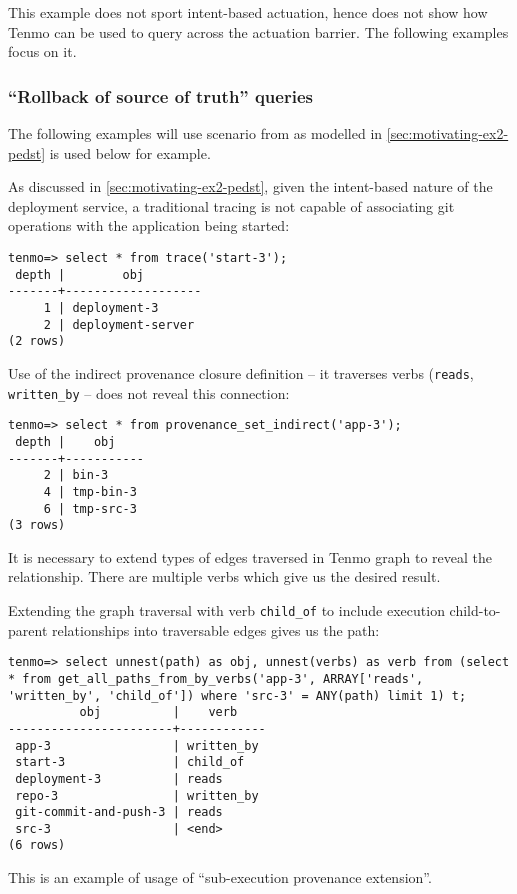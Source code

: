 This example does not sport intent-based actuation, hence does not show how Tenmo can be used to query across the actuation barrier. The following examples focus on it.

\subsubsection{``Rollback of source of truth'' queries}

The following examples will use scenario from  as modelled in \cref{sec:motivating-ex2-pedst} is used below for example.

As discussed in \cref{sec:motivating-ex2-pedst}, given the intent-based nature of the deployment service, a traditional tracing is not capable of associating git operations with the application being started:
\begin{verbatim}
tenmo=> select * from trace('start-3');
 depth |        obj        
-------+-------------------
     1 | deployment-3
     2 | deployment-server
(2 rows)
\end{verbatim}

Use of the indirect provenance closure definition -- it traverses verbs (\texttt{reads}, \texttt{written\_by} -- does not reveal this connection:
%
\begin{verbatim}
tenmo=> select * from provenance_set_indirect('app-3');
 depth |    obj    
-------+-----------
     2 | bin-3
     4 | tmp-bin-3
     6 | tmp-src-3
(3 rows)
\end{verbatim}

It is necessary to extend types of edges traversed in Tenmo graph to reveal the relationship. There are multiple verbs which give us the desired result.

Extending the graph traversal with verb \texttt{child\_of} to include execution child-to-parent relationships into traversable edges gives us the path:
%
\begin{verbatim}
tenmo=> select unnest(path) as obj, unnest(verbs) as verb from (select * from get_all_paths_from_by_verbs('app-3', ARRAY['reads', 'written_by', 'child_of']) where 'src-3' = ANY(path) limit 1) t;
          obj          |    verb    
-----------------------+------------
 app-3                 | written_by
 start-3               | child_of
 deployment-3          | reads
 repo-3                | written_by
 git-commit-and-push-3 | reads
 src-3                 | <end>
(6 rows)
\end{verbatim}
%
This is an example of usage of ``sub-execution provenance extension''.

